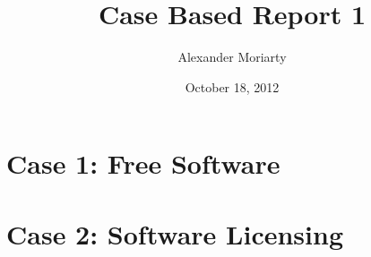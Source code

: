 \documentclass[11pt, oneside]{report}   	%
\title{Case Based Report 1}
\author{Alexander Moriarty}
\date{October 18, 2012}							%
\begin{document}
\maketitle

\chapter{Case 1: Free Software}
\clearpage



\chapter{Case 2: Software Licensing}
\clearpage



\end{document}
